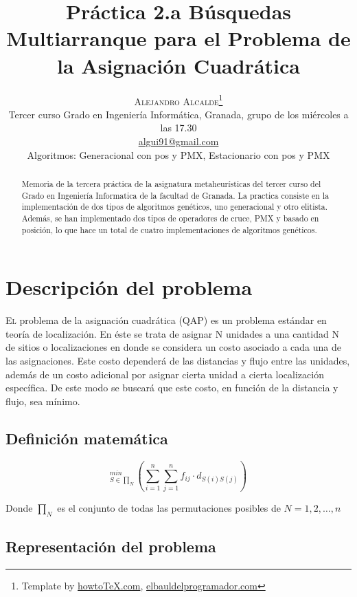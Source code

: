 \documentclass[twoside]{article}
\title{\vspace{-15mm}%
	\fontsize{24pt}{10pt}\selectfont
	\textbf{Práctica 2.a Búsquedas Multiarranque para el Problema de la Asignación Cuadrática}
	}
\author{%
	\large
	\textsc{Alejandro Alcalde}\thanks{Template by \href{http://www.howtotex.com}{howtoTeX.com}, \href{http://www.elbauldelprogramador.com}{elbauldelprogramador.com}} \\[2mm]
	\normalsize	Tercer curso Grado en Ingeniería Informática, Granada, grupo de los miércoles a las 17.30 \\
	\normalsize	\href{mailto:algui91@gmail.com}{algui91@gmail.com}	\\
	\normalsize Algoritmos: Generacional con pos y PMX, Estacionario con pos y PMX
	\vspace{-5mm}
	}
\date{}
\begin{document}
\maketitle
\thispagestyle{fancy}
\tableofcontents
\newpage

\begin{abstract}
\noindent Memoria de la tercera práctica de la asignatura metaheurísticas
del tercer curso del Grado en Ingeniería Informatica de la facultad de Granada.
La practica consiste en la implementación de dos tipos de algoritmos genéticos,
uno generacional y otro elitista. Además, se han implementado dos tipos
de operadores de cruce, PMX y basado en posición, lo que hace un total de
cuatro implementaciones de algoritmos genéticos.
\end{abstract}


\section{Descripción del problema}

\lettrine[nindent=0em,lines=3]{E}l problema de la asignación cuadrática (QAP) es un problema estándar en teoría de localización. En éste se trata de asignar N unidades a una cantidad N de sitios o localizaciones en donde se considera un costo asociado a cada una de las asignaciones. Este costo dependerá de las distancias y flujo entre las unidades, además de un costo adicional por asignar cierta unidad a cierta localización específica. De este modo se buscará que este costo, en función de la distancia y flujo, sea mínimo.

\subsection{Definición matemática}

\begin{displaymath}
_{S\in\prod _N}^{min}\left ( \sum_{i=1}^n \sum_{j=1}^n f_{ij} \cdot d_{S(i)S(j)}  \right )
\end{displaymath}

Donde $\prod _N$ es el conjunto de todas las permutaciones posibles de $N={1,2,\dots,n}$

\subsection{Representación del problema}
\end{document}

